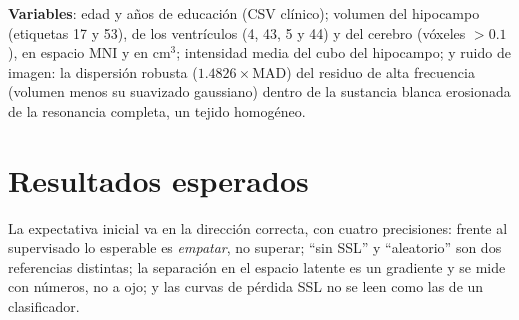 \documentclass[11pt,a4paper]{article}
\begin{document}
\textbf{Variables}: edad y años de educación (CSV clínico); volumen del hipocampo (etiquetas 17 y
53), de los ventrículos (4, 43, 5 y 44) y del cerebro (vóxeles $>0.1$), en espacio MNI y en cm$^3$;
intensidad media del cubo del hipocampo; y ruido de imagen: la dispersión robusta
($1.4826\times$MAD) del residuo de alta frecuencia (volumen menos su suavizado gaussiano) dentro de la
sustancia blanca erosionada de la resonancia completa, un tejido homogéneo.

\section{Resultados esperados}
\label{sec:expected}

\begin{tldrbox}
La expectativa inicial va en la dirección correcta, con cuatro precisiones: frente al supervisado lo
esperable es \emph{empatar}, no superar; ``sin SSL'' y ``aleatorio'' son dos referencias distintas;
la separación en el espacio latente es un gradiente y se mide con números, no a ojo; y las curvas de
pérdida SSL no se leen como las de un clasificador.
\end{tldrbox}
\end{document}
